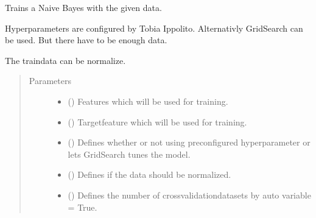 \documentclass[letterpaper,10pt,english]{sphinxmanual}
\begin{document}
\begin{fulllineitems}
\label{\detokenize{anoog.model:anoog.model.model.train_naive_bayes}}
\sphinxAtStartPar
Trains a Naive Bayes with the given data.

\sphinxAtStartPar
Hyperparameters are configured by Tobia Ippolito. Alternativly GridSearch can be used. But there have to be enough data.

\sphinxAtStartPar
The traindata can be normalize.
\begin{quote}\begin{description}
\item[{Parameters}] \leavevmode\begin{itemize}
\item {} 
\sphinxAtStartPar
{} () \textendash{} Features which will be used for training.

\item {} 
\sphinxAtStartPar
{} () \textendash{} Target\sphinxhyphen{}feature which will be used for training.

\item {} 
\sphinxAtStartPar
{} (\sphinxstyleliteralemphasis{\sphinxupquote{, }}) \textendash{} Defines whether or not using preconfigured hyperparameter or lets GridSearch tunes the model.

\item {} 
\sphinxAtStartPar
{} (\sphinxstyleliteralemphasis{\sphinxupquote{, }}) \textendash{} Defines if the data should be normalized.

\item {} 
\sphinxAtStartPar
{} (\sphinxstyleliteralemphasis{\sphinxupquote{, }}) \textendash{} Defines the number of cross\sphinxhyphen{}validation\sphinxhyphen{}datasets by auto variable = True.


\end{itemize}
\end{description}
\end{quote}
\end{fulllineitems}
\end{document}
